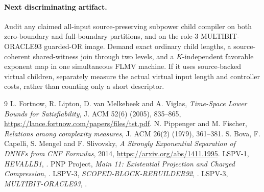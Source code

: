 \documentclass[11pt]{article}
\begin{document}
\paragraph{Next discriminating artifact.}
Audit any claimed all-input source-preserving subpower child compiler on both zero-boundary and full-boundary partitions, and on the role-3 MULTIBIT-ORACLE93 guarded-OR image. Demand exact ordinary child lengths, a source-coherent shared-witness join through two levels, and a \(K\)-independent favorable exponent map in one simultaneous FLMV machine. If it uses source-backed virtual children, separately measure the actual virtual input length and controller costs, rather than counting only a short descriptor.

\begin{thebibliography}{9}
 L. Fortnow, R. Lipton, D. van Melkebeek and A. Viglas, \emph{Time-Space Lower Bounds for Satisfiability}, J. ACM 52(6) (2005), 835--865, \url{https://lance.fortnow.com/papers/files/tst.pdf}.
 N. Pippenger and M. Fischer, \emph{Relations among complexity measures}, J. ACM 26(2) (1979), 361--381.
 S. Bova, F. Capelli, S. Mengel and F. Slivovsky, \emph{A Strongly Exponential Separation of DNNFs from CNF Formulas}, 2014, \url{https://arxiv.org/abs/1411.1995}.
 LSPV-1, \emph{HEVALLB1}, .
 PNP Project, \emph{Main 11: Existential Projection and Charged Compression}, .
 LSPV-3, \emph{SCOPED-BLOCK-REBUILDER92}, .
 LSPV-3, \emph{MULTIBIT-ORACLE93}, .
\end{thebibliography}
\end{document}
